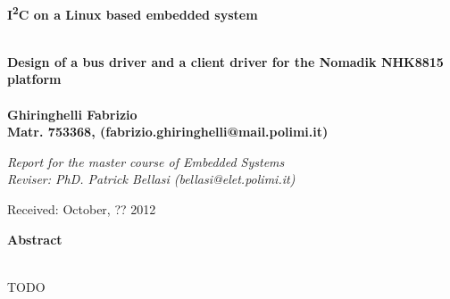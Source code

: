 \documentclass[a4paper,10pt]{article}
\newenvironment*{mytitle}{\begin{LARGE}\bf}{\end{LARGE}\\}%
\newenvironment*{mysubtitle}{\bf}{\\[1.5ex]}%
\newenvironment*{myabstract}{\begin{Large}\bf}{\end{Large}\\[2.5ex]}%
\newcommand{\iic}{I\textsuperscript{2}C }
\begin{document}
\begin{mytitle}\iic on a Linux based embedded system\end{mytitle}
\begin{mysubtitle}
Design of a bus driver and a client driver for the Nomadik NHK8815 platform
\end{mysubtitle}
%
%
\\
Ghiringhelli Fabrizio\\
Matr. 753368, (fabrizio.ghiringhelli@mail.polimi.it)\\
\hspace{10ex}
\begin{flushright}
\emph{Report for the master course of Embedded Systems}\\
\emph{Reviser: PhD. Patrick Bellasi (bellasi@elet.polimi.it)}
\end{flushright}

Received: October, ?? 2012\\
\hspace{10ex}

\begin{myabstract} Abstract \end{myabstract}
TODO
\end{document}
